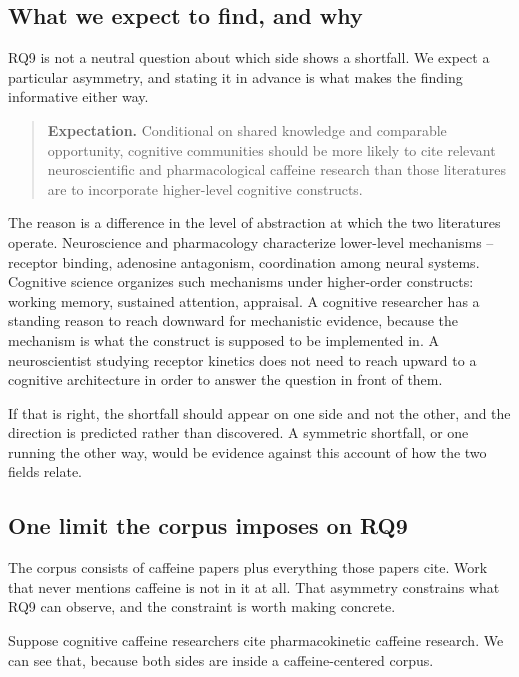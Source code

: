 \documentclass[11pt]{article}
\begin{document}
\subsection{What we expect to find, and why}

RQ9 is not a neutral question about which side shows a shortfall. We expect a particular
asymmetry, and stating it in advance is what makes the finding informative either way.

\begin{quote}
\textbf{Expectation.} Conditional on shared knowledge and comparable opportunity,
cognitive communities should be more likely to cite relevant neuroscientific and
pharmacological caffeine research than those literatures are to incorporate higher-level
cognitive constructs.
\end{quote}

The reason is a difference in the level of abstraction at which the two literatures
operate. Neuroscience and pharmacology characterize lower-level mechanisms -- receptor
binding, adenosine antagonism, coordination among neural systems. Cognitive science
organizes such mechanisms under higher-order constructs: working memory, sustained
attention, appraisal. A cognitive researcher has a standing reason to reach downward for
mechanistic evidence, because the mechanism is what the construct is supposed to be
implemented in. A neuroscientist studying receptor kinetics does not need to reach upward
to a cognitive architecture in order to answer the question in front of them.

If that is right, the shortfall should appear on one side and not the other, and the
direction is predicted rather than discovered. A symmetric shortfall, or one running the
other way, would be evidence against this account of how the two fields relate.

\subsection{One limit the corpus imposes on RQ9}

The corpus consists of caffeine papers plus everything those papers cite. Work that never
mentions caffeine is not in it at all. That asymmetry constrains what RQ9 can observe, and
the constraint is worth making concrete.

Suppose cognitive caffeine researchers cite pharmacokinetic caffeine research. We can see
that, because both sides are inside a caffeine-centered corpus.
\end{document}
